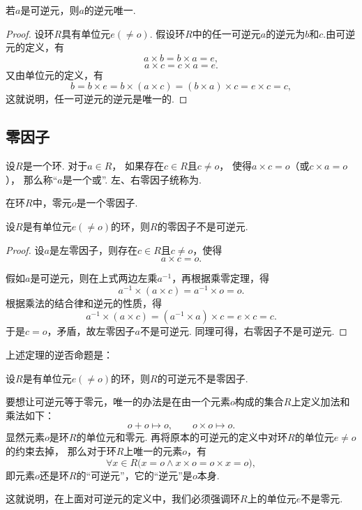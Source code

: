 \begin{property}
若\(a\)是可逆元，则\(a\)的逆元唯一.
\begin{proof}
设环\(R\)具有单位元\(e(\neq o)\).
假设环\(R\)中的任一可逆元\(a\)的逆元为\(b\)和\(c\).由可逆元的定义，有\[
    a \times b = b \times a = e,
\]\[
    a \times c = c \times a = e.
\]
又由单位元的定义，有\[
    b = b \times e
    = b \times (a \times c)
    = (b \times a) \times c
    = e \times c
    = c,
\]
这就说明，任一可逆元的逆元是唯一的.
\end{proof}
\end{property}

\subsection{零因子}
\begin{definition}
设\(R\)是一个环.
对于\(a \in R\)，
如果存在\(c \in R\)且\(c \neq o\)，
使得\(a \times c = o\)（或\(c \times a = o\)），
那么称“\(a\)是一个或”.
左、右零因子统称为.
\end{definition}

\begin{property}
在环\(R\)中，零元\(o\)是一个零因子.
\end{property}

\begin{theorem}
设\(R\)是有单位元\(e(\neq o)\)的环，则\(R\)的零因子不是可逆元.
\begin{proof}
设\(a\)是左零因子，则存在\(c \in R\)且\(c \neq o\)，使得\[
    a \times c = o.
\]

假如\(a\)是可逆元，则在上式两边左乘\(a^{-1}\)，再根据乘零定理，得\[
    a^{-1} \times (a \times c) = a^{-1} \times o = o.
\]
根据乘法的结合律和逆元的性质，得\[
    a^{-1} \times (a \times c) = (a^{-1} \times a) \times c = e \times c = c.
\]
于是\(c = o\)，矛盾，故左零因子\(a\)不是可逆元.
同理可得，右零因子不是可逆元.
\end{proof}
\end{theorem}

上述定理的逆否命题是：
\begin{corollary}
设\(R\)是有单位元\(e(\neq o)\)的环，则\(R\)的可逆元不是零因子.
\end{corollary}

\begin{example}
要想让可逆元等于零元，唯一的办法是在由一个元素\(o\)构成的集合\(R\)上定义加法和乘法如下：\[
    o + o \mapsto o,
    \qquad
    o \times o \mapsto o.
\]
显然元素\(o\)是环\(R\)的单位元和零元.
再将原本的可逆元的定义中对环\(R\)的单位元\(e \neq o\)的约束去掉，
那么对于环\(R\)上唯一的元素\(o\)，有\[
    \forall x \in R \bigl( x = o \land x \times o = o \times x = o \bigr),
\]
即元素\(o\)还是环\(R\)的“可逆元”，它的“逆元”是\(o\)本身.

这就说明，在上面对可逆元的定义中，我们必须强调环\(R\)上的单位元\(e\)不是零元.
\end{example}
